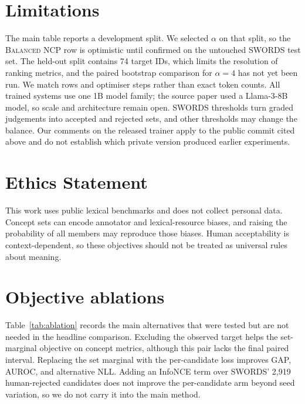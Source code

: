 \documentclass[11pt]{article}
\newcommand{\method}{\textsc{Balanced NCP}}
\begin{document}
\section*{Limitations}

The main table reports a development split. We selected $\alpha$ on that split,
so the \method{} row is optimistic until confirmed on the untouched SWORDS test
set. The held-out split contains 74 target IDs, which limits the resolution of
ranking metrics, and the paired bootstrap comparison for $\alpha=4$ has not yet
been run. We match rows and optimiser steps rather than exact token counts. All
trained systems use one 1B model family; the source paper used a Llama-3-8B model,
so scale and architecture remain open. SWORDS thresholds turn graded judgements
into accepted and rejected sets, and other thresholds may change the balance.
Our comments on the released trainer apply to the public commit cited above and
do not establish which private version produced earlier experiments.

\section*{Ethics Statement}

This work uses public lexical benchmarks and does not collect personal data.
Concept sets can encode annotator and lexical-resource biases, and raising the
probability of all members may reproduce those biases. Human acceptability is
context-dependent, so these objectives should not be treated as universal rules
about meaning.

\appendix
\section{Objective ablations}
\label{sec:ablations}

Table~\ref{tab:ablation} records the main alternatives that were tested but are
not needed in the headline comparison. Excluding the observed target helps the
set-marginal objective on concept metrics, although this pair lacks the final
paired interval. Replacing the set marginal with the per-candidate loss improves
GAP, AUROC, and alternative NLL. Adding an InfoNCE term over SWORDS' 2,919
human-rejected candidates does not improve the per-candidate arm beyond seed
variation, so we do not carry it into the main method.
\end{document}
